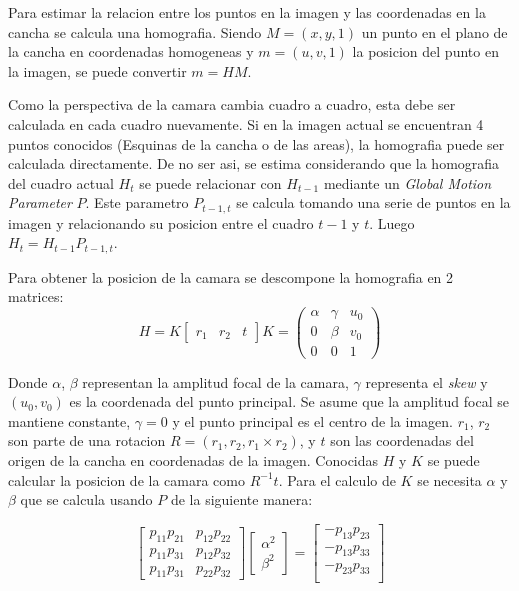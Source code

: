 \documentclass[a4paper,10pt]{article}
\begin{document}
Para estimar la relacion entre los puntos en la imagen y las coordenadas en la cancha se calcula una homografia.
Siendo $M = (x, y, 1)$ un punto en el plano de la cancha en coordenadas homogeneas y $m = (u, v, 1)$ la posicion del punto en la imagen, se puede convertir $ m = H M $.

Como la perspectiva de la camara cambia cuadro a cuadro, esta debe ser calculada en cada cuadro nuevamente.
Si en la imagen actual se encuentran 4 puntos conocidos (Esquinas de la cancha o de las areas), la homografia puede ser calculada directamente.
De no ser asi, se estima considerando que la homografia del cuadro actual $H_t$ se puede relacionar con $H_{t-1}$ mediante un \textit{Global Motion Parameter} $P$.
Este parametro $P_{t-1,t}$ se calcula tomando una serie de puntos en la imagen y relacionando su posicion entre el cuadro $t-1$ y $t$.
Luego $ H_t = H_{t-1} P_{t-1,t}$.

Para obtener la posicion de la camara se descompone la homografia en 2 matrices:
\begin{equation}
H = K \begin{bmatrix} r_1 & r_2 & t \end{bmatrix}
K = \begin{pmatrix} 
    \alpha & \gamma & u_0 \\
    0 & \beta & v_0 \\
    0 & 0 & 1
    \end{pmatrix}
\end{equation}

Donde $\alpha$, $\beta$ representan la amplitud focal de la camara, $\gamma$ representa el \textit{skew} y $(u_0, v_0)$ es la coordenada del punto principal.
Se asume que la amplitud focal se mantiene constante, $\gamma = 0$ y el punto principal es el centro de la imagen.
$r_1$, $r_2$ son parte de una rotacion $R = (r_1, r_2, r_1 \times r_2)$, y $t$ son las coordenadas del origen de la cancha en coordenadas de la imagen.
Conocidas $H$ y $K$ se puede calcular la posicion de la camara como $R^{-1} t$.
Para el calculo de $K$ se necesita $\alpha$ y $\beta$ que se calcula usando $P$ de la siguiente manera:

\begin{equation}
\begin{bmatrix}
    p_{1 1} p_{2 1} & p_{1 2} p_{2 2} \\
    p_{1 1} p_{3 1} & p_{1 2} p_{3 2} \\
    p_{1 1} p_{3 1} & p_{2 2} p_{3 2} 
\end{bmatrix} 
\begin{bmatrix}
    \alpha^2 \\
    \beta^2
\end{bmatrix}
 =
\begin{bmatrix}
    - p_{1 3} p_{2 3} \\
    - p_{1 3} p_{3 3} \\
    - p_{2 3} p_{3 3} \\
\end{bmatrix}
\end{equation}
\end{document}
